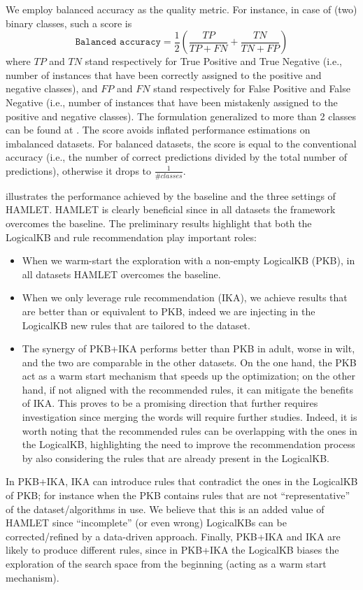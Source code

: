 We employ balanced accuracy as the quality metric.
For instance, in case of (two) binary classes, such a score is
$$
\texttt{Balanced accuracy} = \frac{1}{2}\left ( \frac{TP}{TP + FN} + \frac{TN}{TN + FP}\right )
$$
where $TP$ and $TN$ stand respectively for True Positive and True Negative (i.e., number of instances that have been correctly assigned to the positive and negative classes), and $FP$ and $FN$ stand respectively for False Positive and False Negative (i.e., number of instances that have been mistakenly assigned to the positive and negative classes). The formulation generalized to more than 2 classes can be found at \cite{DBLP:conf/icpr/BrodersenOSB10}.
The score avoids inflated performance estimations on imbalanced datasets.
For balanced datasets, the score is equal to the conventional accuracy (i.e., the number of correct predictions divided by the total number of predictions), otherwise it drops to $\frac{1}{\#classes}$.

 illustrates the performance achieved by the baseline and the three settings of HAMLET.
HAMLET is clearly beneficial since in all datasets the framework overcomes the baseline.
The preliminary results highlight that both the LogicalKB and rule recommendation play important roles:
\begin{itemize}
    \item When we warm-start the exploration with a non-empty LogicalKB (PKB), in all datasets HAMLET overcomes the baseline.
    \item When we only leverage rule recommendation (IKA), we achieve results that are better than or equivalent to PKB, indeed we are injecting in the LogicalKB new rules that are tailored to the dataset.
    \item The synergy of PKB+IKA performs better than PKB in adult, worse in wilt, and the two are comparable in the other datasets.
    On the one hand, the PKB act as a warm start mechanism that speeds up the optimization; on the other hand, if not aligned with the recommended rules, it can mitigate the benefits of IKA.
    This proves to be a promising direction that further requires investigation since merging the words will require further studies.
    Indeed, it is worth noting that the recommended rules can be overlapping with the ones in the LogicalKB, highlighting the need to improve the recommendation process by also considering the rules that are already present in the LogicalKB.
\end{itemize}

In PKB+IKA, IKA can introduce rules that contradict the ones in the LogicalKB of PKB; for instance when the PKB contains rules that are not ``representative'' of the dataset/algorithms in use. We believe that this is an added value of HAMLET since ``incomplete'' (or even wrong) LogicalKBs can be corrected/refined by a data-driven approach. Finally, PKB+IKA and IKA are likely to produce different rules, since in PKB+IKA the LogicalKB biases the exploration of the search space from the beginning (acting as a warm start mechanism).

